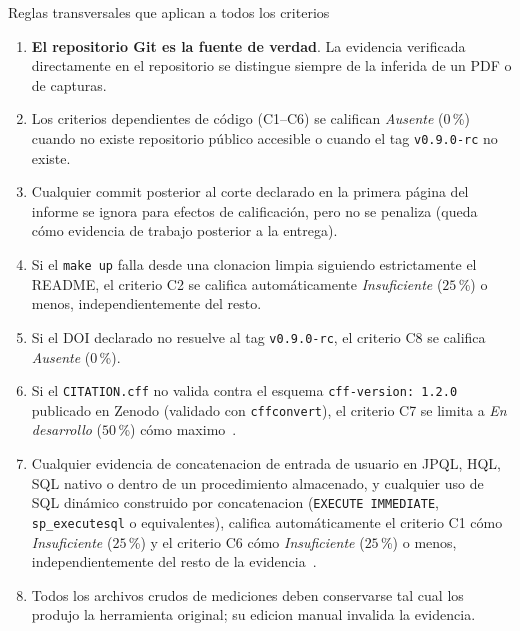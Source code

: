 \documentclass[11pt,a4paper]{article}
\begin{document}
\begin{cajacritica}{Reglas transversales que aplican a todos los criterios}
    \begin{enumerate}
        \item \textbf{El repositorio Git es la fuente de verdad}. La evidencia verificada directamente en el repositorio se distingue siempre de la inferida de un PDF o de capturas.
        \item Los criterios dependientes de c\'{o}digo (C1--C6) se califican \emph{Ausente} ($0$\,\%) cuando no existe repositorio p\'{u}blico accesible o cuando el tag \texttt{v0.9.0-rc} no existe.
        \item Cualquier commit posterior al corte declarado en la primera p\'{a}gina del informe se ignora para efectos de calificaci\'{o}n, pero no se penaliza (queda c\'{o}mo evidencia de trabajo posterior a la entrega).
        \item Si el \texttt{make up} falla desde una clonacion limpia siguiendo estrictamente el README, el criterio C2 se califica autom\'{a}ticamente \emph{Insuficiente} ($25$\,\%) o menos, independientemente del resto.
        \item Si el DOI declarado no resuelve al tag \texttt{v0.9.0-rc}, el criterio C8 se califica \emph{Ausente} ($0$\,\%).
        \item Si el \texttt{CITATION.cff} no valida contra el esquema \texttt{cff-version: 1.2.0} publicado en Zenodo (validado con \texttt{cffconvert}), el criterio C7 se limita a \emph{En desarrollo} ($50$\,\%) c\'{o}mo maximo~\cite{druskat2021cff}.
        \item Cualquier evidencia de concatenacion de entrada de usuario en JPQL, HQL, SQL nativo o dentro de un procedimiento almacenado, y cualquier uso de SQL din\'{a}mico construido por concatenacion (\texttt{EXECUTE IMMEDIATE}, \texttt{sp\_executesql} o equivalentes), califica autom\'{a}ticamente el criterio C1 c\'{o}mo \emph{Insuficiente} ($25$\,\%) y el criterio C6 c\'{o}mo \emph{Insuficiente} ($25$\,\%) o menos, independientemente del resto de la evidencia~\cite{owaspsqlicheatsheet,owasp2021top10}.
        \item Todos los archivos crudos de mediciones deben conservarse tal cual los produjo la herramienta original; su edicion manual invalida la evidencia.
    \end{enumerate}
\end{cajacritica}

\end{document}
